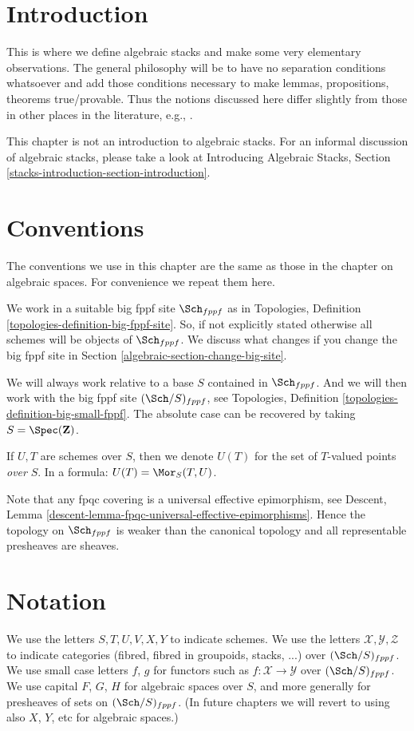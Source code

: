 \section{Introduction}
\label{algebraic-section-introduction}
This is where we define algebraic stacks and make some very elementary
observations. The general philosophy will be to have no separation
conditions whatsoever and add those conditions necessary to make lemmas,
propositions, theorems true/provable. Thus the notions discussed here
differ slightly from those in other places in the literature, e.g.,
\cite{LM-B}.

\medskip\noindent
This chapter is not an introduction to algebraic stacks.
For an informal discussion of algebraic stacks, please take a look at
Introducing Algebraic Stacks, Section
\ref{stacks-introduction-section-introduction}.

\section{Conventions}
\label{algebraic-section-conventions}
The conventions we use in this chapter are the same as those in the
chapter on algebraic spaces. For convenience we repeat them here.

\medskip\noindent
We work in a suitable big fppf site $\Sch_{fppf}$
as in Topologies, Definition \ref{topologies-definition-big-fppf-site}.
So, if not explicitly stated otherwise all schemes will be objects
of $\Sch_{fppf}$. We discuss what changes if you change the big
fppf site in
Section \ref{algebraic-section-change-big-site}.

\medskip\noindent
We will always work relative to a base $S$ contained in $\Sch_{fppf}$.
And we will then work with the big fppf site $(\Sch/S)_{fppf}$, see
Topologies, Definition \ref{topologies-definition-big-small-fppf}.
The absolute case can be recovered by taking
$S = \Spec(\mathbf{Z})$.

\medskip\noindent
If $U, T$ are schemes over $S$, then we denote
$U(T)$ for the set of $T$-valued points {\it over} $S$.
In a formula: $U(T) = \Mor_S(T, U)$.

\medskip\noindent
Note that any fpqc covering is a universal effective
epimorphism, see
Descent, Lemma \ref{descent-lemma-fpqc-universal-effective-epimorphisms}.
Hence the topology on $\Sch_{fppf}$
is weaker than the canonical topology and all representable presheaves
are sheaves.

\section{Notation}
\label{algebraic-section-notation}
We use the letters $S, T, U, V, X, Y$ to indicate schemes.
We use the letters $\mathcal{X}, \mathcal{Y}, \mathcal{Z}$ to indicate
categories (fibred, fibred in groupoids, stacks, ...)
over $(\Sch/S)_{fppf}$. We use small case letters
$f$, $g$ for functors such as $f : \mathcal{X} \to \mathcal{Y}$
over $(\Sch/S)_{fppf}$.
We use capital $F$, $G$, $H$ for algebraic spaces over $S$, and more
generally for presheaves of sets on $(\Sch/S)_{fppf}$.
(In future chapters we will revert to using also $X$, $Y$, etc
for algebraic spaces.)

